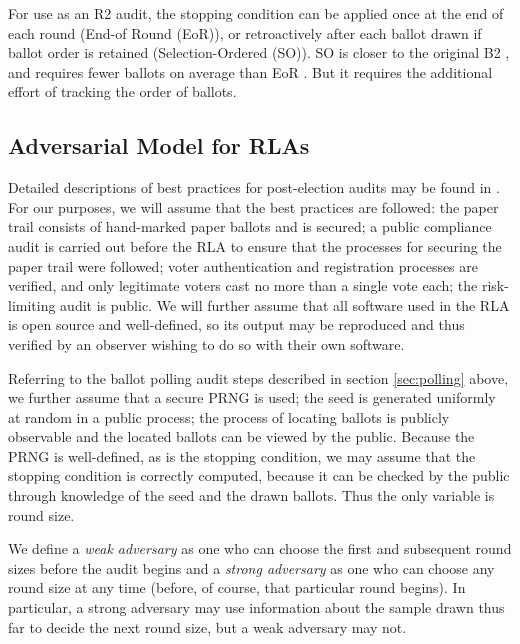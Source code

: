 For use as an R2 audit, the \BRAVO stopping condition can be applied once at the end of each round (End-of Round (EoR)), or retroactively after each ballot drawn if ballot order is retained (Selection-Ordered (SO)). SO \BRAVO is closer to the original B2 \BRAVO, and requires fewer ballots on average than EoR \BRAVO. But it requires the additional effort of tracking the order of ballots. 

\subsection{Adversarial Model for RLAs}
\label{sec:adv}
Detailed descriptions of best practices for post-election audits may be found in \cite{best-practices,why-and-how}. For our purposes, we will assume that the best practices are followed: the paper trail consists of hand-marked paper ballots and is secured; a public compliance audit is carried out before the RLA to ensure that the processes for securing the paper trail were followed; voter authentication and registration processes are verified, and only legitimate voters cast no more than a single vote each; the risk-limiting audit is public. We will further assume that all software used in the RLA is open source and well-defined, so its output may be reproduced and thus verified by an observer wishing to do so with their own software. 

Referring to the ballot polling audit steps described in section \ref{sec:polling} above, we further assume that a secure PRNG is used; the seed is generated uniformly at random in a public process; the process of locating ballots is publicly observable and the located ballots can be viewed by the public. Because the PRNG is well-defined, as is the stopping condition, we may assume that the stopping condition is correctly computed, because it can be checked by the public through knowledge of the seed and the drawn ballots. Thus the only variable is round size. 

We define a {\em weak adversary} as one who can choose the first and subsequent round sizes before the audit begins and a {\em strong adversary} as one who can choose any round size at any time (before, of course, that particular round begins). In particular, a strong adversary may use information about the sample drawn thus far to decide the next round size, but a weak adversary may not. 

